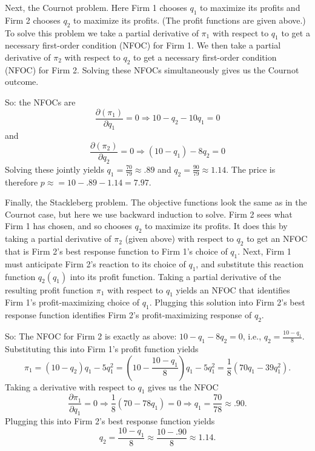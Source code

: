 \begin{enumerate}
{Next, the Cournot problem. Here Firm 1 chooses $q_1$ to maximize its profits and Firm 2 chooses $q_2$ to maximize its profits. (The profit functions are given above.) To solve this problem we take a partial derivative of $\pi_1$ with respect to $q_1$ to get a necessary first-order condition (NFOC) for Firm 1. We then take a partial derivative of $\pi_2$ with respect to $q_2$ to get a necessary first-order condition (NFOC) for Firm 2. Solving these NFOCs simultaneously gives us the Cournot outcome.

So: the NFOCs are
\[
\frac{\partial (\pi_1)}{\partial q_1}=0\Longrightarrow 10-q_2-10q_1=0
\]
and
\[
\frac{\partial (\pi_2)}{\partial q_2}=0\Longrightarrow (10-q_1) -8q_2=0
\]
Solving these jointly yields $q_1=\frac{70}{79}\approx .89$ and $q_2=\frac{90}{79}\approx 1.14$. The price is therefore $p\approx=10-.89-1.14=7.97$.


Finally, the Stackleberg problem. The objective functions look the same as in the Cournot case, but here we use backward induction to solve. Firm 2 sees what Firm 1 has chosen, and so chooses $q_2$ to maximize its profits. It does this by taking a partial derivative of $\pi_2$ (given above) with respect to $q_2$ to get an NFOC that is Firm 2's best response function to Firm 1's choice of $q_1$. Next, Firm 1 must anticipate Firm 2's reaction to its choice of $q_1$, and substitute this reaction function $q_2(q_1)$ into its profit function. Taking a partial derivative of the resulting profit function $\pi_1$ with respect to $q_1$ yields an NFOC that identifies Firm 1's profit-maximizing choice of $q_1$. Plugging this solution into Firm 2's best response function identifies Firm 2's profit-maximizing response of $q_2$.

So: The NFOC for Firm 2 is exactly as above: $10-q_1-8q_2=0$, i.e., $q_2=\frac{10-q_1}{8}$. Substituting this into Firm 1's profit function yields
\[
\pi_1=(10-q_2)q_1-5q_1^2=\left(10-\frac{10-q_1}{8}\right)q_1-5q_1^2=\frac{1}{8}(70q_1-39q_1^2).
\]
Taking a derivative with respect to $q_1$ gives us the NFOC
\[
\frac{\partial\pi_1}{\partial q_1}=0\Longrightarrow \frac{1}{8}(70-78q_1)=0\Longrightarrow q_1=\frac{70}{78}\approx .90.
\]
Plugging this into Firm 2's best response function yields
\[
q_2=\frac{10-q_1}{8}\approx\frac{10-.90}{8}\approx 1.14.
\]}

















\end{enumerate}
